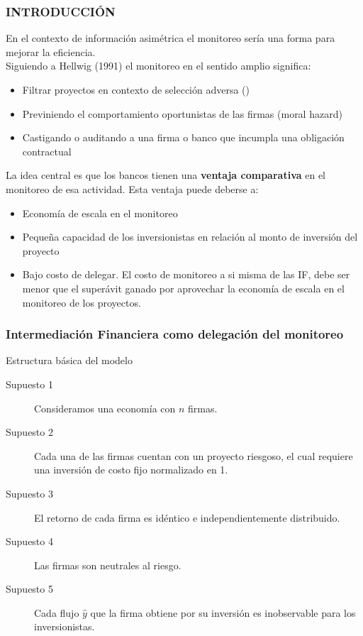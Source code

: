 \begin{frame}
	\frametitle{{\normalsize INTRODUCCIÓN} {}}
	\setcounter{equation}{0}
En el contexto de información asimétrica el monitoreo sería una forma para mejorar la eficiencia.\\
Siguiendo a Hellwig (1991) el monitoreo en el sentido amplio significa:
\begin{itemize}
    \item Filtrar proyectos en contexto de selección adversa (\cite{Broecker1990}) 
    \item Previniendo el comportamiento oportunistas de las firmas (moral hazard) \cite{Tirole1997} 
    \item Castigando o auditando a una firma o banco que incumpla una obligación contractual \cite{Diamond1984}
\end{itemize}    
  
La idea central es que los bancos tienen una \textbf{ventaja comparativa} en el monitoreo de esa actividad. Esta ventaja puede deberse a:
\begin{itemize}
    \item Economía de escala en el monitoreo\\
    \item Pequeña capacidad de los inversionistas en relación al monto de inversión del proyecto
    \item Bajo costo de delegar. El costo de monitoreo a si misma de las IF, debe ser menor que el superávit ganado por aprovechar la economía de escala en el monitoreo de los proyectos.
\end{itemize} 

\end{frame}

\begin{frame}
    \frametitle{{\normalsize Intermediación Financiera como delegación del monitoreo} {}}
    
    \begin{block} {Estructura básica del modelo}
        \begin{description}
            \item[Supuesto 1] Consideramos una economía con $n$ firmas.
            \item[Supuesto 2] Cada una de las firmas cuentan con un proyecto riesgoso, el cual requiere una inversión de costo fijo normalizado en 1. 
            \item[Supuesto 3] El retorno de cada firma es idéntico e independientemente distribuido.  
            \item[Supuesto 4]  Las firmas son neutrales al riesgo.
            \item[Supuesto 5] Cada flujo $\hat{y}$ que la firma obtiene por su inversión es inobservable para los inversionistas.
            \end{description}
        
    \end{block}	
    
\end{frame}






